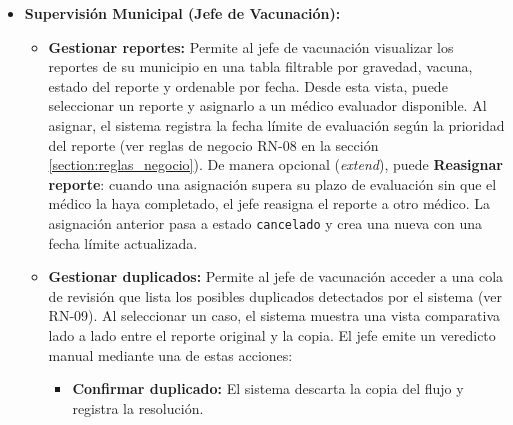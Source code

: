 \begin{itemize}
\begin{itemize}
            Al completar el envío, el sistema genera un número de notificación único, envía un mensaje al jefe de vacunación del municipio correspondiente sobre el nuevo reporte.
            Este caso de uso posee una relación de tipo \textit{extend} hacia \textbf{Exportar a PDF}, lo que indica que el usuario puede, opcionalmente, generar un comprobante documental tras completar el registro.

            \item \textbf{Consultar estado de reporte:} Permite al reportante verificar el estado de sus envíos previos ingresando el número de notificación.
        \end{itemize}


    \item \textbf{Supervisión Municipal (Jefe de Vacunación):}
    \begin{itemize}
        \item \textbf{Gestionar reportes:} Permite al jefe de vacunación visualizar los reportes de su municipio en una tabla filtrable por gravedad, vacuna, estado del reporte y ordenable por fecha. 
        Desde esta vista, puede seleccionar un reporte y asignarlo a un médico evaluador disponible. 
        Al asignar, el sistema registra la fecha límite de evaluación según la prioridad del reporte (ver reglas de negocio RN-08 en la sección \ref{section:reglas_negocio}). 
        De manera opcional (\textit{extend}), puede \textbf{Reasignar reporte}: cuando una asignación supera su plazo de evaluación sin que el médico la haya completado, el jefe reasigna el reporte a otro médico. 
        La asignación anterior pasa a estado \texttt{cancelado} y crea una nueva con una fecha límite actualizada.
        \item \textbf{Gestionar duplicados:} Permite al jefe de vacunación acceder a una cola de revisión que lista los posibles duplicados detectados por el sistema (ver RN-09). 
            Al seleccionar un caso, el sistema muestra una vista comparativa lado a lado entre el reporte original y la copia. El jefe emite un veredicto manual mediante una de estas acciones:
            \begin{itemize}
                \item \textbf{Confirmar duplicado:} El sistema descarta la copia del flujo y registra la resolución.

\end{itemize}
\end{itemize}
\end{itemize}
